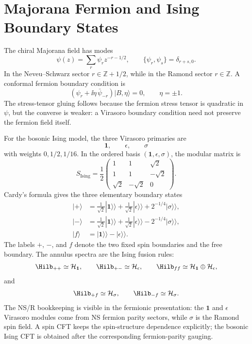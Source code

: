 \section{Majorana Fermion and Ising Boundary States}

The chiral Majorana field has modes
\[
  \psi(z)=\sum_r\psi_r z^{-r-1/2},
  \qquad
  \{\psi_r,\psi_s\}=\delta_{r+s,0}.
\]
In the Neveu--Schwarz sector \(r\in\mathbb Z+1/2\), while in the Ramond
sector \(r\in\mathbb Z\).  A conformal fermion boundary condition is
\begin{equation}
  \left(\psi_r+\ii\eta\,\bar\psi_{-r}\right)|B,\eta\rangle=0,
  \qquad
  \eta=\pm1 .
  \label{eq:majorana-fermion-gluing}
\end{equation}
The stress-tensor gluing follows because the fermion stress tensor is
quadratic in \(\psi\), but the converse is weaker: a Virasoro boundary
condition need not preserve the fermion field itself.

For the bosonic Ising model, the three Virasoro primaries are
\[
  \mathbf 1,\qquad \epsilon,\qquad \sigma
\]
with weights \(0,1/2,1/16\).  In the ordered basis
\((\mathbf 1,\epsilon,\sigma)\), the modular matrix is
\begin{equation}
  S_{\mathrm{Ising}}
  =
  \frac12
  \begin{pmatrix}
    1&1&\sqrt2\\
    1&1&-\sqrt2\\
    \sqrt2&-\sqrt2&0
  \end{pmatrix}.
  \label{eq:ising-modular-s-matrix-bcft}
\end{equation}
Cardy's formula gives the three elementary boundary states
\begin{align}
  |+\rangle
  &=
  \frac1{\sqrt2}|\mathbf 1\rangle\!\rangle
  +
  \frac1{\sqrt2}|\epsilon\rangle\!\rangle
  +
  2^{-1/4}|\sigma\rangle\!\rangle,
  \label{eq:ising-plus-boundary-state}\\
  |-\rangle
  &=
  \frac1{\sqrt2}|\mathbf 1\rangle\!\rangle
  +
  \frac1{\sqrt2}|\epsilon\rangle\!\rangle
  -
  2^{-1/4}|\sigma\rangle\!\rangle,
  \label{eq:ising-minus-boundary-state}\\
  |f\rangle
  &=
  |\mathbf 1\rangle\!\rangle
  -
  |\epsilon\rangle\!\rangle .
  \label{eq:ising-free-boundary-state}
\end{align}
The labels \(+\), \(-\), and \(f\) denote the two fixed spin boundaries and
the free boundary.  The annulus spectra are the Ising fusion rules:
\[
  \Hilb_{++}\simeq\mathcal H_{\mathbf 1},\qquad
  \Hilb_{+-}\simeq\mathcal H_{\epsilon},\qquad
  \Hilb_{ff}\simeq\mathcal H_{\mathbf 1}\oplus\mathcal H_{\epsilon},
\]
and
\[
  \Hilb_{+f}\simeq\mathcal H_{\sigma},
  \qquad
  \Hilb_{-f}\simeq\mathcal H_{\sigma}.
\]
The NS/R bookkeeping is visible in the fermionic presentation: the
\(\mathbf 1\) and \(\epsilon\) Virasoro modules come from NS fermion
parity sectors, while \(\sigma\) is the Ramond spin field.  A spin CFT keeps
the spin-structure dependence explicitly; the bosonic Ising CFT is obtained
after the corresponding fermion-parity gauging.

